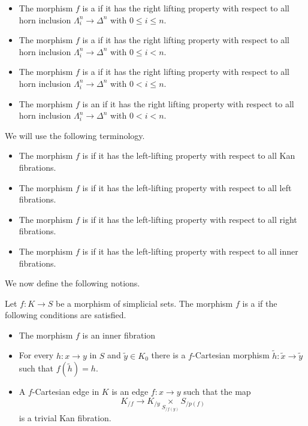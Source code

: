 \documentclass[main.tex]{subfiles}
\begin{document}
\begin{itemize}
  \item The morphism $f$ is a  if it has the right lifting property with respect to all horn inclusion $\Lambda^{n}_{i} \to \Delta^{n}$ with $0 \leq i \leq n$.

  \item The morphism $f$ is a  if it has the right lifting property with respect to all horn inclusion $\Lambda^{n}_{i} \to \Delta^{n}$ with $0 \leq i < n$.

  \item The morphism $f$ is a  if it has the right lifting property with respect to all horn inclusion $\Lambda^{n}_{i} \to \Delta^{n}$ with $0 < i \leq n$.

  \item The morphism $f$ is an  if it has the right lifting property with respect to all horn inclusion $\Lambda^{n}_{i} \to \Delta^{n}$ with $0 < i < n$.
\end{itemize}

We will use the following terminology.
\begin{itemize}
  \item The morphism $f$ is  if it has the left-lifting property with respect to all Kan fibrations.

  \item The morphism $f$ is  if it has the left-lifting property with respect to all left fibrations.

  \item The morphism $f$ is  if it has the left-lifting property with respect to all right fibrations.

  \item The morphism $f$ is  if it has the left-lifting property with respect to all inner fibrations.
\end{itemize}

We now define the following notions.

\begin{definition}
  \label{def:cartesian_fibration}
  Let $f\colon K \to S$ be a morphism of simplicial sets. The morphism $f$ is a  if the following conditions are satisfied.
  \begin{itemize}
    \item The morphism $f$ is an inner fibration

    \item For every $h\colon x \to y$ in $S$ and $\tilde{y} \in K_{0}$ there is a $f$-Cartesian morphism $\tilde{h}\colon \tilde{x} \to \tilde{y}$ such that $f(\tilde{h}) = h$.

    \item A $f$-Cartesian edge in $K$ is an edge $f\colon x \to y$ such that the map
      \begin{equation*}
        K_{/f} \to K_{/y} \underset{S_{/f(y)}}{\times} S_{/p(f)}
      \end{equation*}
      is a trivial Kan fibration.
  \end{itemize}
\end{definition}
\end{document}
